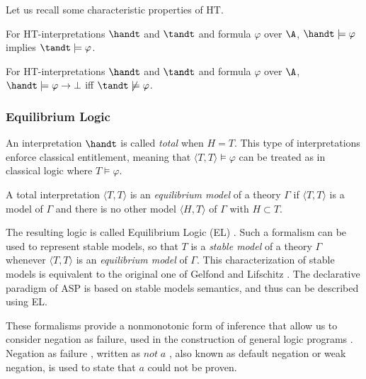 Let us recall some characteristic properties of HT.
\begin{lemma}
    For HT-interpretations $\handt$ and $\tandt$ and formula $\varphi$ over $\A$, $\handt \models \varphi$ implies $\tandt \models \varphi$.
\end{lemma}

\begin{lemma}
    For HT-interpretations $\handt$ and $\tandt$ and formula $\varphi$ over $\A$, $\handt \models \varphi \to \bot$ iff $\tandt \not \models \varphi$.
\end{lemma}

\subsubsection{Equilibrium Logic}

An interpretation $\handt$ is called \emph{total} when $H = T$. 
This type of interpretations enforce classical entitlement, meaning that $\langle T,T \rangle \models \varphi$ can be treated as in classical logic where $T\models \varphi$. 
\begin{definition}
    A total interpretation $\langle T,T\rangle$ is an \emph{equilibrium model} of a theory $\Gamma$ if $\langle T,T\rangle$ is a model of $\Gamma$ and there is no other model $\langle H,T\rangle$ of $\Gamma$ with $H \subset T$.
\end{definition}

The resulting logic is called Equilibrium Logic (EL) \cite{pearce06a}. Such a formalism can be used to represent stable models, so that $T$ is a \emph{stable model} of a theory $\Gamma$ whenever $\langle T,T\rangle$ is an \emph{equilibrium model} of $\Gamma$. 
This characterization of stable models is equivalent to the original one of Gelfond and Lifschitz \cite{gellif88b}. The declarative paradigm of ASP is based on stable models semantics, and thus can be described using EL. 

These formalisms provide a nonmonotonic form of inference that allow us to consider negation as failure, used in the construction of general logic programs \cite{gerosc91a}. 
Negation as failure \cite{clark78a}, written as $\mathit{not}\;a$ , also known as default negation or weak negation, is used to state that $a$ could not be proven. 

